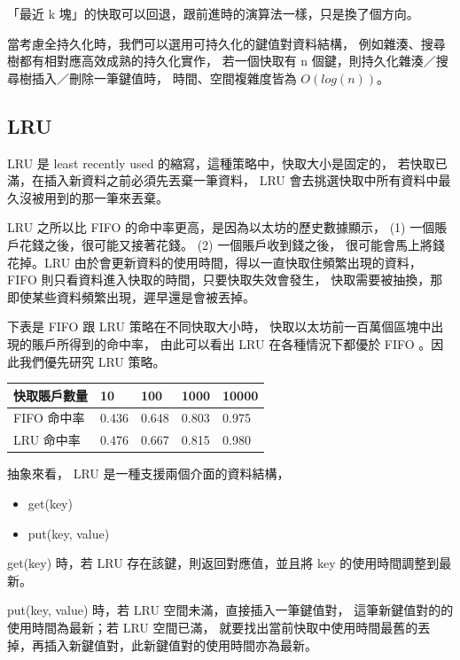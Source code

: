 「最近 k 塊」的快取可以回退，跟前進時的演算法一樣，只是換了個方向。

當考慮全持久化時，我們可以選用可持久化的鍵值對資料結構，
例如雜湊\cite{bagwell2001ideal}\cite{puente2017persistence}、搜尋樹都有相對應高效成熟的持久化實作，
若一個快取有 n 個鍵，則持久化雜湊／搜尋樹插入／刪除一筆鍵值時，
時間、空間複雜度皆為 $O(log(n))$。

\subsection{LRU}

LRU 是 least recently used 的縮寫，這種策略中，快取大小是固定的，
若快取已滿，在插入新資料之前必須先丟棄一筆資料，
LRU 會去挑選快取中所有資料中最久沒被用到的那一筆來丟棄。

LRU 之所以比 FIFO 的命中率更高，是因為以太坊的歷史數據顯示，
(1) 一個賬戶花錢之後，很可能又接著花錢。 (2) 一個賬戶收到錢之後，
很可能會馬上將錢花掉。LRU 由於會更新資料的使用時間，得以一直快取住頻繁出現的資料，
FIFO 則只看資料進入快取的時間，只要快取失效會發生，
快取需要被抽換，那即使某些資料頻繁出現，遲早還是會被丟掉。

下表是 FIFO 跟 LRU 策略在不同快取大小時，
快取以太坊前一百萬個區塊中出現的賬戶所得到的命中率，
由此可以看出 LRU 在各種情況下都優於 FIFO 。因此我們優先研究 LRU 策略。

\begin{center}
\begin{tabular}{ | m{6em} | m{1cm}| m{1cm} | m{1cm} | m{1cm} | } 
\hline
快取賬戶數量& 10 & 100 & 1000 & 10000 \\ 
\hline
FIFO 命中率& 0.436 & 0.648 & 0.803 & 0.975 \\ 
\hline
LRU 命中率& 0.476 & 0.667 & 0.815 & 0.980\\ 
\hline
\end{tabular}
\end{center}


抽象來看， LRU 是一種支援兩個介面的資料結構，

\begin{itemize}
  \item get(key)
  \item put(key, value)
\end{itemize}

get(key) 時，若 LRU 存在該鍵，則返回對應值，並且將 key 的使用時間調整到最新。

put(key, value) 時，若 LRU 空間未滿，直接插入一筆鍵值對，
這筆新鍵值對的的使用時間為最新；若 LRU 空間已滿，
就要找出當前快取中使用時間最舊的丟掉，再插入新鍵值對，此新鍵值對的使用時間亦為最新。

